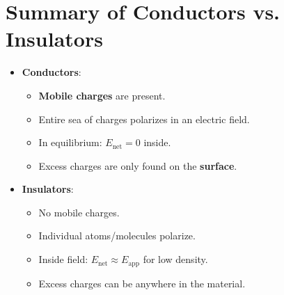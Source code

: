\documentclass{article}
\begin{document}
\section*{Summary of Conductors vs. Insulators}
\begin{itemize}
    \item \textbf{Conductors}:
    \begin{itemize}
        \item \textbf{Mobile charges} are present.
        \item Entire sea of charges polarizes in an electric field.
        \item In equilibrium: \(E_{\text{net}} = 0\) inside.
        \item Excess charges are only found on the \textbf{surface}.
    \end{itemize}
    \item \textbf{Insulators}:
    \begin{itemize}
        \item No mobile charges.
        \item Individual atoms/molecules polarize.
        \item Inside field: \(E_{\text{net}} \approx E_{\text{app}}\) for low density.
        \item Excess charges can be anywhere in the material.
    \end{itemize}
\end{itemize}
\end{document}
